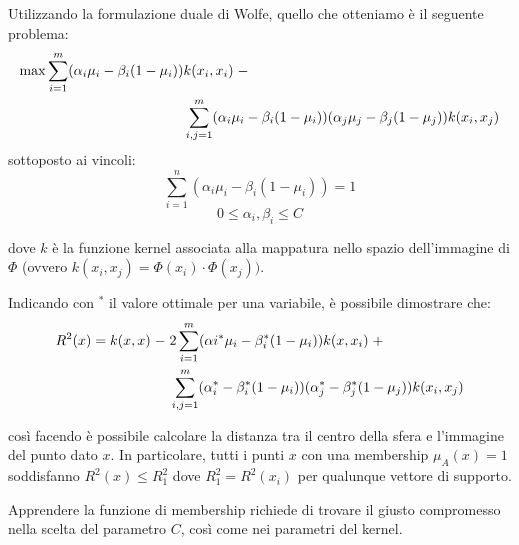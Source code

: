\documentclass[a4paper,12pt]{report}
\begin{document}
Utilizzando la formulazione duale di Wolfe, quello che otteniamo è il seguente problema:
\begin{equation}
\begin{split}
    \max \displaystyle\sum_{i=1}^{m}(\alpha_i\mu_i - \beta_i(1-\mu_i))&k(x_i,x_i)\hspace{0,1cm}- \\ &\displaystyle\sum_{i,j=1}^{m}(\alpha_i\mu_i - \beta_i(1-\mu_i))(\alpha_j\mu_j - \beta_j(1-\mu_j))k(x_i,x_j)
\end{split}
\label{eq:problema_finale}
\end{equation}
sottoposto ai vincoli:
\begin{equation}
    \displaystyle\sum_{i=1}^{n}(\alpha_i\mu_i - \beta_i(1-\mu_i)) = 1
    \label{eq:v1_problema_finale}
\end{equation}
\begin{equation}
    0 \le \alpha_i,\beta_i \le C
    \label{eq:v2_problema_finale}
\end{equation}

dove $k$ è la funzione kernel associata alla mappatura nello spazio dell'immagine di $\Phi$ (ovvero $k(x_i,x_j) = \Phi(x_i)\cdot\Phi(x_j))$.

Indicando con $^*$ il valore ottimale per una variabile, è possibile dimostrare che:
\begin{equation*}
\begin{split}
    R^{2}(x) = k(x,x) \hspace{0,1cm}- \hspace{0,1cm}&2\displaystyle\sum_{i=1}^{m}(\alpha{i}^{*}\mu_{i} - \beta_{i}^{*}(1-\mu_{i}))k(x,x_i)\hspace{0,1cm} + \\ 
    &\displaystyle\sum_{i,j=1}^{m}(\alpha_{i}^{*} - \beta_{i}^{*}(1-\mu_{i}))(\alpha_{j}^{*} - \beta_{j}^{*}(1-\mu_{j}))k(x_i,x_j)
\end{split}
\end{equation*}

così facendo è possibile calcolare la distanza tra il centro della sfera e l'immagine del punto dato $x$.
In particolare, tutti i punti $x$ con una membership $\mu_{A}(x) = 1$ soddisfanno $R^2(x) \le R^2_1$ dove $R^2_1 = R^2(x_i)$ per qualunque vettore di supporto.

Apprendere la funzione di membership richiede di trovare il giusto compromesso nella scelta del parametro $C$, così come nei parametri del kernel.




%
%
\end{document}
